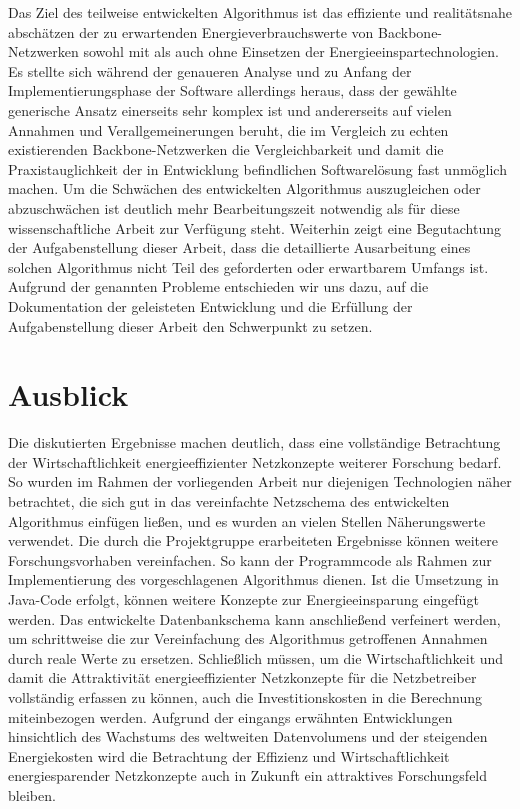 \documentclass[12pt,titlepage]{article}
\begin{document}
Das Ziel des teilweise entwickelten Algorithmus ist das effiziente und realitätsnahe abschätzen der zu erwartenden Energieverbrauchswerte von Backbone-Netzwerken sowohl mit als auch ohne Einsetzen der Energieeinspartechnologien. Es stellte sich während der genaueren Analyse und zu Anfang der Implementierungsphase der Software allerdings heraus, dass der gewählte generische Ansatz einerseits sehr komplex ist und andererseits auf vielen Annahmen und Verallgemeinerungen beruht, die im Vergleich zu echten existierenden Backbone-Netzwerken die Vergleichbarkeit und damit die Praxistauglichkeit der in Entwicklung befindlichen Softwarelösung fast unmöglich machen.
Um die Schwächen des entwickelten Algorithmus auszugleichen oder abzuschwächen ist deutlich mehr Bearbeitungszeit notwendig als für diese wissenschaftliche Arbeit zur Verfügung steht.
Weiterhin zeigt eine Begutachtung der Aufgabenstellung dieser Arbeit, dass die detaillierte Ausarbeitung eines solchen Algorithmus nicht Teil des geforderten oder erwartbarem Umfangs ist.
Aufgrund der genannten Probleme entschieden wir uns dazu, auf die Dokumentation der geleisteten Entwicklung und die Erfüllung der Aufgabenstellung dieser Arbeit den Schwerpunkt zu setzen.


\section{Ausblick}
%
Die diskutierten Ergebnisse machen deutlich, dass eine vollständige Betrachtung der Wirtschaftlichkeit energieeffizienter Netzkonzepte weiterer Forschung bedarf. So wurden im Rahmen der vorliegenden Arbeit nur diejenigen Technologien näher betrachtet, die sich gut in das vereinfachte Netzschema des entwickelten Algorithmus einfügen ließen, und es wurden an vielen Stellen Näherungswerte verwendet.
Die durch die Projektgruppe erarbeiteten Ergebnisse können weitere Forschungsvorhaben vereinfachen. So kann der Programmcode	 als Rahmen zur Implementierung des vorgeschlagenen Algorithmus dienen. Ist die Umsetzung in Java-Code erfolgt, können weitere Konzepte zur Energieeinsparung eingefügt werden. Das entwickelte Datenbankschema kann anschließend verfeinert werden, um schrittweise die zur Vereinfachung des Algorithmus getroffenen Annahmen durch reale Werte zu ersetzen. Schließlich müssen, um die Wirtschaftlichkeit und damit die Attraktivität energieeffizienter Netzkonzepte für die Netzbetreiber vollständig erfassen zu können, auch die Investitionskosten in die Berechnung miteinbezogen werden.
Aufgrund der eingangs erwähnten Entwicklungen hinsichtlich des Wachstums des weltweiten Datenvolumens und der steigenden Energiekosten wird die Betrachtung der Effizienz und Wirtschaftlichkeit energiesparender Netzkonzepte auch in Zukunft ein attraktives Forschungsfeld bleiben.

\newpage
\printbibliography
\end{document}
